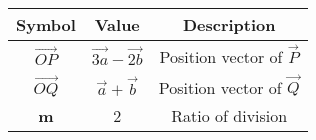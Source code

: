 \begin{tabular}[12pt]{|c|c|c|}
	\hline
	\textbf{Symbol} & \textbf{Value} & \textbf{Description}\\
	\hline
	$\overrightarrow{OP}$ & $\overrightarrow{3a} - \overrightarrow{2b}$ & Position vector of $\vec{P}$ \\
	\hline 
	$\overrightarrow{OQ}$ & $\overrightarrow{a} + \overrightarrow{b}$ & Position vector of $\vec{Q}$ \\
	\hline
	\textbf{m} & 2 & Ratio of division\\
	\hline
\end{tabular}
